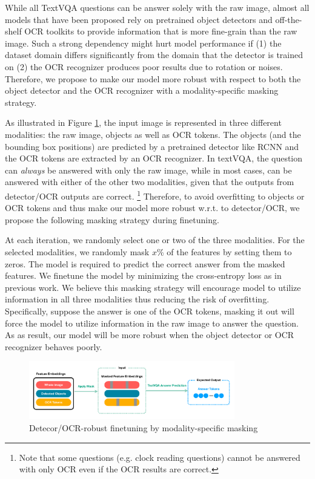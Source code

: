 \documentclass[11pt,a4paper]{article}
\begin{document}
While all TextVQA questions can be answer solely with the raw image, almost all models that have been proposed rely on pretrained object detectors and off-the-shelf OCR toolkits to provide information that is more fine-grain than the raw image. Such a strong dependency might hurt model performance if (1) the dataset domain differs significantly from the domain that the detector is trained on (2) the OCR recognizer produces poor results due to rotation or noises. Therefore, we propose to make our model more robust with respect to both the object detector and the OCR recognizer with a modality-specific masking strategy.

As illustrated in Figure \ref{fig:finetune}, the input image is represented in three different modalities: the raw image, objects  as well as OCR tokens. The objects (and the bounding box positions) are predicted by a pretrained detector like RCNN and the OCR tokens are extracted by an OCR recognizer. In textVQA, the question can \textit{always} be answered with only the raw image, while in most cases, can be answered with either of the other two modalities, given that the outputs from detector/OCR outputs are correct. \footnote{Note that some questions (e.g. clock reading questions) cannot be answered with only OCR even if the OCR results are correct.} Therefore, to avoid overfitting to objects or OCR tokens and thus make our model more robust w.r.t. to detector/OCR, we propose the following masking strategy during finetuning.

At each iteration, we randomly select one or two of the three modalities. For the selected modalities, we randomly mask $x$\% of the features by setting them to zeros. The model is required to predict the correct answer from the masked features. We finetune the model by minimizing the cross-entropy loss as in previous work. We believe this masking strategy will encourage model to utilize information in all three modalities thus reducing the risk of overfitting. Specifically, suppose the answer is one of the OCR tokens, masking it out will force the model to utilize information in the raw image to answer the question. As as result, our model will be more robust when the object detector or OCR recognizer behaves poorly.
\begin{figure}[h]
\centering
  \includegraphics[width=0.8\textwidth]{figures/Multitask_FineTuning.pdf}
  \caption{Detecor/OCR-robust finetuning by modality-specific masking}
  \label{fig:finetune}
\end{figure}
\end{document}
